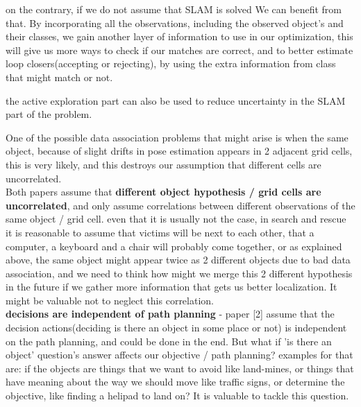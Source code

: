 \documentclass{article}
\begin{document}
	on the contrary, if we do not assume that SLAM is solved We can benefit from that.
	By incorporating all the observations, including the observed object's and their classes, we gain another layer of information to use in our optimization, this will give us more ways to check if our matches are correct, and to better estimate loop closers(accepting or rejecting), by using the extra information from class that might match or not. 
	
	the active exploration part can also be used to reduce uncertainty in the SLAM part of the problem.
	
	One of the possible data association problems that might arise is when the same object, because of slight drifts in pose estimation appears in 2 adjacent grid cells, this is very likely, and this destroys our assumption that different cells are uncorrelated.  \\
	
	Both papers assume that \textbf{different object hypothesis / grid cells are uncorrelated}, and only assume correlations between different observations of the same object / grid cell. even that it is usually not the case, in search and rescue it is reasonable to assume that victims will be next to each other, that a computer, a keyboard and a chair will probably come together, or as explained above, the same object might appear twice as 2 different objects due to bad data association, and we need to think how might we merge this 2 different hypothesis in the future if we gather more information that gets us better localization. It might be valuable not to neglect this correlation. \\
	
	\textbf{decisions are independent of path planning} - paper [2] assume that the decision actions(deciding is there an object in some place or not) is independent on the path planning, and could be done in the end. But what if 'is there an object' question's answer affects our objective / path planning? examples for that are: if the objects are things that we want to avoid like land-mines, or things that have meaning about the way we should move like traffic signs, or determine the objective, like finding a helipad to land on? It is valuable to tackle this question.	
  
\end{document}
